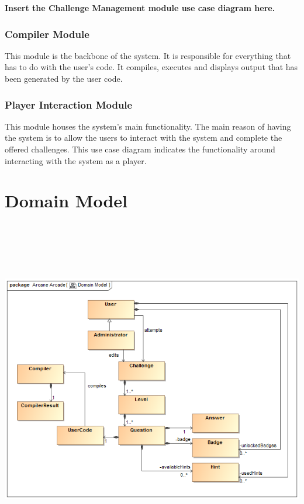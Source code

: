 \documentclass[english]{article}
\begin{document}
\textbf{Insert the Challenge Management module use case diagram here.} \newline
		\subsubsection{Compiler Module}
		This module is the backbone of the system. It is responsible for everything that has to do with the user's code. It compiles, executes and displays output that has been generated by the user code.
		
		\subsubsection{Player Interaction Module}
		This module houses the system's main functionality. The main reason of having the system is to allow the users to interact with the system and complete the offered challenges. This use case diagram indicates the functionality around interacting with the system as a player.
		
		
		\section{Domain Model}
		 \includegraphics[width=15cm,height=15cm,keepaspectratio]{domainModel v2.png}
	\iffalse	
\end{document}

